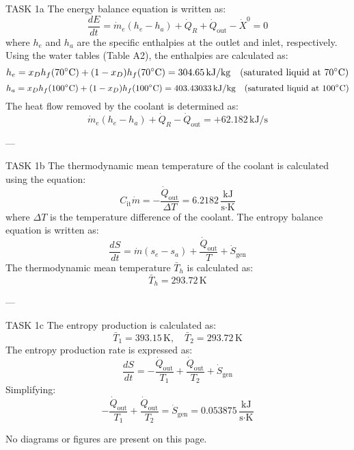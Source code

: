 TASK 1a  
The energy balance equation is written as:  
\[
\frac{dE}{dt} = \dot{m}_e (h_e - h_a) + \dot{Q}_R + \dot{Q}_{\text{out}} - \dot{X}^0 = 0
\]  
where \( h_e \) and \( h_a \) are the specific enthalpies at the outlet and inlet, respectively. Using the water tables (Table A2), the enthalpies are calculated as:  
\[
h_e = x_D h_f(70^\circ\text{C}) + (1 - x_D) h_f(70^\circ\text{C}) = 304.65 \, \text{kJ/kg} \quad \text{(saturated liquid at \( 70^\circ\text{C} \))}
\]  
\[
h_a = x_D h_f(100^\circ\text{C}) + (1 - x_D) h_f(100^\circ\text{C}) = 403.43033 \, \text{kJ/kg} \quad \text{(saturated liquid at \( 100^\circ\text{C} \))}
\]  
The heat flow removed by the coolant is determined as:  
\[
\dot{m}_e (h_e - h_a) + \dot{Q}_R - \dot{Q}_{\text{out}} = +62.182 \, \text{kJ/s}
\]  

---

TASK 1b  
The thermodynamic mean temperature of the coolant is calculated using the equation:  
\[
C_{\text{it}} \dot{m} = -\frac{\dot{Q}_{\text{out}}}{\Delta T} = 6.2182 \, \frac{\text{kJ}}{\text{s·K}}
\]  
where \( \Delta T \) is the temperature difference of the coolant.  
The entropy balance equation is written as:  
\[
\frac{dS}{dt} = \dot{m}(s_e - s_a) + \frac{\dot{Q}_{\text{out}}}{T} + \dot{S}_{\text{gen}}
\]  
The thermodynamic mean temperature \( \bar{T}_h \) is calculated as:  
\[
\bar{T}_h = 293.72 \, \text{K}
\]  

---

TASK 1c  
The entropy production is calculated as:  
\[
\bar{T}_1 = 393.15 \, \text{K}, \quad \bar{T}_2 = 293.72 \, \text{K}
\]  
The entropy production rate is expressed as:  
\[
\frac{dS}{dt} = -\frac{\dot{Q}_{\text{out}}}{T_1} + \frac{\dot{Q}_{\text{out}}}{T_2} + \dot{S}_{\text{gen}}
\]  
Simplifying:  
\[
-\frac{\dot{Q}_{\text{out}}}{T_1} + \frac{\dot{Q}_{\text{out}}}{T_2} = \dot{S}_{\text{gen}} = 0.053875 \, \frac{\text{kJ}}{\text{s·K}}
\]  

No diagrams or figures are present on this page.